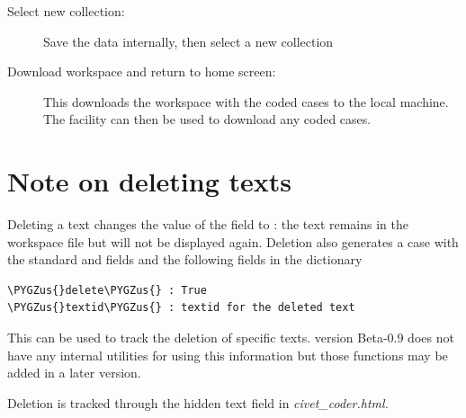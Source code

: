 \documentclass[letterpaper,10pt,english]{sphinxmanual}
\def\PYGZus{\char`\_}
\begin{document}
\begin{enumerate}
\begin{description}
\item[{Select new collection:}] \leavevmode
Save the data internally, then select a new collection

\item[{Download workspace and return to home screen:}] \leavevmode
This downloads the workspace with the coded cases to the local
machine. The {\hyperref[workspaces:sec-management]{\emph{}}} facility  can then be used to download any coded cases.

\end{description}

\end{enumerate}


\section{Note on deleting texts}
\label{extraction:note-on-deleting-texts}
Deleting a text changes the value of the  field to
: the text remains in the workspace file but will not be
displayed again. Deletion also generates a case with the standard
 and  fields and the following fields in the
 dictionary

\begin{Verbatim}[commandchars=\\\{\}]
\PYGZus{}delete\PYGZus{} : True
\PYGZus{}textid\PYGZus{} : textid for the deleted text
\end{Verbatim}

This can be used to track the deletion of specific texts. version
Beta-0.9 does not have any internal utilities for using this
information but those functions may be added in a later version.

Deletion is tracked through the hidden text field 
in \emph{civet\_coder.html.}
\end{document}
